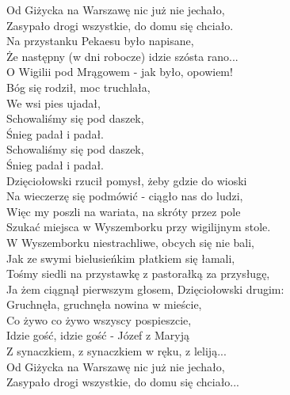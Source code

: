 
Od Giżycka na Warszawę nic już nie jechało,  \tab{} \\
Zasypało drogi wszystkie, do domu się chciało. \\
Na przystanku Pekaesu było napisane, \tab{}\\
Że następny (w dni robocze) idzie szósta rano... \\
\hops
O Wigilii pod Mrągowem - jak było, opowiem!  \\
Bóg się rodził, moc truchlała, \tab{}\tab{}\\
We wsi pies ujadał, \tab{}\tab{}\\
Schowaliśmy się pod daszek, \tab{}\tab{}\\
Śnieg padał i padał. \tab{}\tab{}\\
Schowaliśmy się pod daszek, \tab{}\tab{}\\
Śnieg padał i padał. \tab{}\tab{}\\
\hops
Dzięciołowski rzucił pomysł, żeby gdzie do wioski \\
Na wieczerzę się podmówić - ciągło nas do ludzi, \\
Więc my poszli na wariata, na skróty przez pole \\
Szukać miejsca w Wyszemborku przy wigilijnym stole. \\
\hops
W Wyszemborku niestrachliwe, obcych się nie bali, \\
Jak ze swymi bielusieńkim płatkiem się łamali, \\
Tośmy siedli na przystawkę z pastorałką za przysługę, \\
Ja żem ciągnął pierwszym głosem, Dzięciołowski drugim: \\
\hops
Gruchnęła, gruchnęła nowina w mieście, \tab{}\\
Co żywo co żywo wszyscy pospieszcie, \tab{}\\
Idzie gość, idzie gość - Józef z Maryją \tab{}\\
Z synaczkiem, z synaczkiem w ręku, z leliją... \tab{}\\
\hops
Od Giżycka na Warszawę nic już nie jechało, \\
Zasypało drogi wszystkie, do domu się chciało...